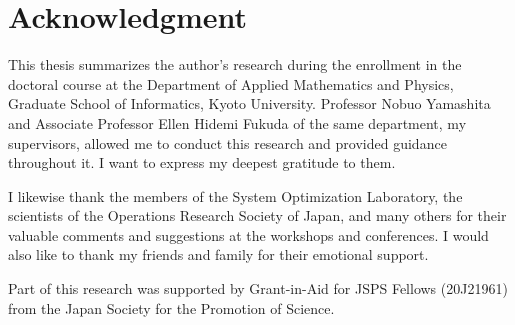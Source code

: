 \documentclass[../main]{subfiles}
\begin{document}
\chapter*{Acknowledgment}
This thesis summarizes the author's research during the enrollment in the doctoral course at the Department of Applied Mathematics and Physics, Graduate School of Informatics, Kyoto University. Professor Nobuo Yamashita and Associate Professor Ellen Hidemi Fukuda of the same department, my supervisors, allowed me to conduct this research and provided guidance throughout it. I want to express my deepest gratitude to them.

I likewise thank the members of the System Optimization Laboratory, the scientists of the Operations Research Society of Japan, and many others for their valuable comments and suggestions at the workshops and conferences. I would also like to thank my friends and family for their emotional support.

Part of this research was supported by Grant-in-Aid for JSPS Fellows (20J21961) from the Japan Society for the Promotion of Science.
\end{document}
